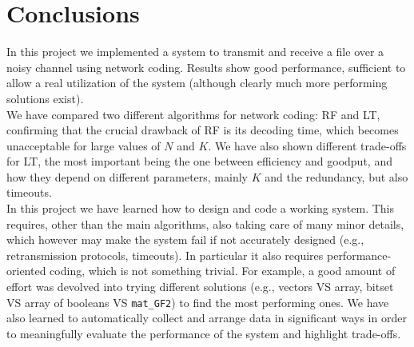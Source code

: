 \section{Conclusions}\label{sec:concl}
In this project we implemented a system to transmit and receive a file over a noisy channel using network coding. Results show good performance, sufficient to allow a real utilization of the system (although clearly much more performing solutions exist).\\
We have compared two different algorithms for network coding: RF and LT, confirming that the crucial drawback of RF is its decoding time, which becomes unacceptable for large values of $N$ and $K$. We have also shown different trade-offs for LT, the most important being the one between efficiency and goodput, and how they depend on different parameters, mainly $K$ and the redundancy, but also timeouts.\\
In this project we have learned how to design and code a working system. This requires, other than the main algorithms, also taking care of many minor details, which however may make the system fail if not accurately designed (e.g., retransmission protocols, timeouts). In particular it also requires performance-oriented coding, which is not something trivial. For example, a good amount of effort was devolved into trying different solutions (e.g., vectors VS array, bitset VS array of booleans VS \texttt{mat\_GF2}) to find the most performing ones. We have also learned to automatically collect and arrange data in significant ways in order to meaningfully evaluate the performance of the system and highlight trade-offs.

